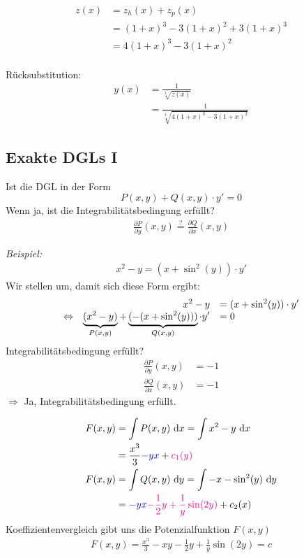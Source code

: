 \documentclass[main.tex]{subfiles}
\begin{document}
\begin{align*}
	z(x) &= z_h(x) + z_p(x) \\
		 &= (1+x)^3 -3(1+x)^2 + 3(1+x)^3 \\
		 &= 4(1+x)^3 -3(1+x)^2 \\
\end{align*}

Rücksubstitution:
\begin{align*}
	y(x) &= \frac{1}{\sqrt[3]{z(x)}} \\
		 &= \frac{1}{\sqrt[3]{4(1+x)^3 -3(1+x)^2}}
\end{align*}

\subsection{Exakte DGLs I} \label{exakte1}
Ist die DGL in der Form
$$
	P(x,y) + Q(x,y)\cdot y' = 0
$$
Wenn ja, ist die Integrabilitätsbedingung erfüllt?
\begin{align*}
	\frac{\partial P}{\partial y} (x,y) \overset{?}{=} \frac{\partial Q}{\partial x}(x,y)
\end{align*}

\textit{Beispiel:}\\
\begin{align*}
	x^2 -y = (x + \sin^2(y))\cdot y'
\end{align*}
Wir stellen um, damit sich diese Form ergibt: 
\[\everymath={\displaystyle}\begin{array}{crl}
				& x^2 -y &= (x + \sin^2(y)) \cdot y' \\
\equiv & \underbrace{(x^2 -y)}_{P(x,y)} + \underbrace{(-(x+\sin^2(y)))}_{Q(x,y)} \cdot y' & = 0 \\
\end{array}\]
Integrabilitätsbedingung erfüllt?
\begin{align*}
	\frac{\partial P}{\partial y}(x,y) &= -1 \\
	\frac{\partial Q}{\partial x}(x,y) &= -1 
\end{align*}
$\Rightarrow$ Ja, Integrabilitätsbedingung erfüllt.

\begin{align*}
	F(x,y) &= \int P(x,y) ~\mathrm{d}x = \int x^2 -y ~\mathrm{d}x \\
		&= \frac{x^3}{3} \textcolor{blue}{-y x} + \textcolor{magenta}{c_1(y)} \\
	F(x,y) &= \int Q(x,y) ~\mathrm{d}y = \int -x - \sin^2(y) ~\mathrm{d}y \\
		&= \textcolor{blue}{-y x} \textcolor{magenta}{-\frac{1}{2}y + \frac{1}{y} \sin(2 y)} + c_2(x)\\
\end{align*}
Koeffizientenvergleich gibt uns die Potenzialfunktion $F(x,y)$
\begin{align*}
	F(x,y) = \frac{x^3}{3} -xy -\frac{1}{2}y + \frac{1}{y} \sin(2 y) = c
\end{align*}
\end{document}
